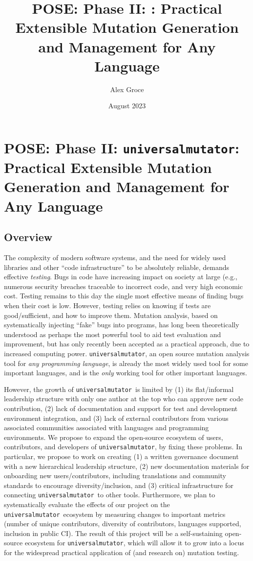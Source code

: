 \documentclass[numbers]{proposalnsf}
\title{POSE: Phase II: \um: Practical Extensible Mutation Generation and Management for Any Language}
\author{Alex Groce }
\date{August 2023}
\newcommand{\um}{\texttt{universalmutator}}
\begin{document}
\section*{POSE: Phase II: \um: Practical Extensible Mutation Generation and Management for Any Language}

\subsection*{Overview}
\vspace{-2mm}

The complexity of modern software systems, and the need for widely used libraries and other ``code infrastructure'' to be absolutely reliable, demands effective \emph{testing}.  Bugs in code have increasing impact on society at large (e.g., numerous security breaches traceable to incorrect code, and very high economic cost.  Testing remains to this day the single most effective means of finding bugs when their cost is low.  However, testing relies on knowing if tests are good/sufficient, and how to improve them.  Mutation analysis, based on systematically injecting ``fake'' bugs into programs, has long been theoretically understood as perhaps the most powerful tool to aid test evaluation and improvement, but has only recently been accepted as a practical approach, due to increased computing power.  \um, an open source mutation analysis tool for \emph{any programming language}, is already the most widely used tool for some important languages, and is the \emph{only} working tool for other important languages.

However, the growth of \um\ is limited by (1) its flat/informal leadership structure with only one author at the top who can approve new code contribution,  (2) lack of documentation and support for test and development environment integration, and (3) lack of external contributors from various associated communities associated with languages and programming environments.
We propose to expand the open-source ecosystem of users, contributors, and developers of \um, by fixing these problems.
In particular, we propose to work on creating (1) a written governance document with a new hierarchical leadership structure, (2) new documentation materials for onboarding new users/contributors, including translations and community standards to encourage diversity/inclusion, and (3) critical infrastructure for connecting \um\ to other tools.  Furthermore, we plan to systematically evaluate the effects of our project on the \um\ ecosystem by measuring changes to important metrics (number of unique contributors, diversity of contributors, languages supported, inclusion in public CI). 
The result of this project will be a self-sustaining open-source ecosystem for \um, which will allow it to grow into a locus for the widespread practical application of (and research on) mutation testing.
\end{document}
